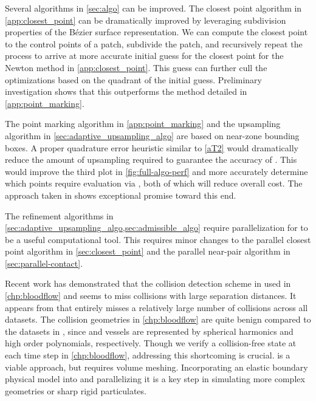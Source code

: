 Several algorithms in \cref{sec:algo} can be improved. 
The closest point algorithm in \cref{app:closest_point} can be dramatically improved by leveraging subdivision properties of the B\'ezier surface representation.
We can compute the closest point to the control points of a patch, subdivide the patch, and recursively repeat the process to arrive at more accurate initial guess for the closest point for the \twod Newton method in \cref{app:closest_point}. 
This guess can further cull the \oned optimizations based on the quadrant of the initial guess.
Preliminary investigation shows that this outperforms the method detailed in \cref{app:point_marking}.

The point marking algorithm in \cref{app:point_marking} and the upsampling algorithm in \cref{sec:adaptive_upsampling_algo} are based on near-zone bounding boxes.
A proper quadrature error heuristic similar to \cref{aT2} would dramatically reduce the amount of upsampling required to guarantee the accuracy of \qbkix. 
This would improve the third plot in \cref{fig:full-algo-perf} and more accurately determine which points require evaluation via \qbkix, both of which will reduce overall cost.
The approach taken in \cite{klinteberg2020quadrature} shows exceptional promise toward this end.

The refinement algorithms in \cref{sec:adaptive_upsampling_algo,sec:admissible_algo} require parallelization for \qbkix to be a useful computational tool. 
This requires minor changes to the parallel closest point algorithm in \cref{sec:closest_point} and the parallel near-pair algorithm in \cref{sec:parallel-contact}.

Recent work \cite{wang2021benchmark} has demonstrated that the collision detection scheme in \cite{Harmon2011} used in \cref{chp:bloodflow} and \cite{lu2019scalable,lu2018parallel} seems to miss collisions with large separation distances. 
It appears from \cite[Section 6]{wang2021benchmark} that \cite{Harmon2011} entirely misses a relatively large number of collisions across all datasets.
The collision geometries in \cref{chp:bloodflow} are quite benign compared to the datasets in \cite{wang2021benchmark}, since \rbcs and vessels are represented by spherical harmonics and high order polynomials, respectively.
Though we verify a collision-free state at each time step in \cref{chp:bloodflow}, addressing this shortcoming is crucial.
\cite{li2020incremental} is a viable approach, but requires \rbc volume meshing. 
Incorporating an elastic boundary physical model into \cite{li2020incremental} and parallelizing it is a key step in simulating more complex geometries or sharp rigid particulates. 
